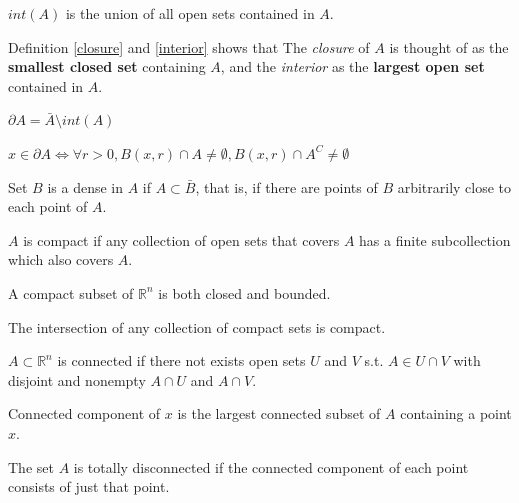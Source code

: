 \begin{definition}[Interior]\label{interior}
    $int(A)$ is the union of all open sets contained in $A$.
\end{definition}

Definition \ref{closure} and \ref{interior} shows that The \textit{closure} 
of $A$ is thought of as the \textbf{smallest closed set} containing $A$, 
and the \textit{interior} as the \textbf{largest open set} contained in $A$.

\begin{definition}[Boundary]
    $\partial A = \bar{A}\setminus int(A)$
\end{definition}

\begin{theorem}
    $x\in\partial A \Leftrightarrow \forall r > 0, B(x, r) \cap A \neq \emptyset, B(x, r) \cap A^C \neq \emptyset$ 
\end{theorem}

\begin{definition}[Dense]
    Set $B$ is a dense in $A$ if $A\subset \bar{B}$, that is, if there are points of $B$ arbitrarily close to each point of $A$.
\end{definition}

\begin{definition}[Compact]
    $A$ is compact if any collection of open sets that covers $A$ has a finite subcollection which also covers $A$.
\end{definition}

\begin{theorem}
    A compact subset of $\mathbb{R}^n$ is both closed and bounded.
\end{theorem}

\begin{theorem}
    The intersection of any collection of compact sets is compact.
\end{theorem}

\begin{definition}[Connected]
    $A\subset \mathbb{R}^n$ is connected if there not exists open sets $U$ and $V$ s.t. $A\in U\cap V$ with disjoint and nonempty $A\cap U$ and $A\cap V$.
\end{definition}

\begin{definition}
Connected component of $x$ is the largest connected subset of $A$ containing a point $x$.
\end{definition}

\begin{definition}[Disconnect]
    The set $A$ is totally disconnected if the connected component of each point consists of just that point.
\end{definition}

